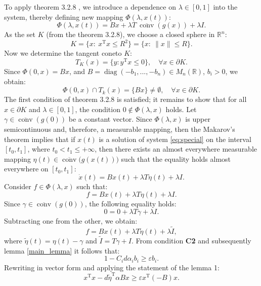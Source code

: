 \documentclass[journal]{IEEEtran}
\begin{document}
\begin{IEEEproof}
    To apply theorem 3.2.8 \cite[p. 90]{p3}, 
    we introduce a dependence on $\lambda \in [0,1]$ into the system, thereby defining new mapping $\varPhi(\lambda,x(t))$:
    \[\varPhi(\lambda,x(t)) = Bx + \lambda T~ \overline{\operatorname{conv}}(g(x))+\lambda I.\]
    As the set $K$ (from the theorem 3.2.8), we choose a closed sphere in $\mathbb{R}^n$:
    \[K = \{x:~x^\mathrm{T}x \leqslant R^2 \} = \{ x:~\|x\| \leqslant R\}.\]
Now we determine the tangent cone\footnotemark[2] to $K$:
\[T_K(x) = \{y : y^\mathrm{T}x \leqslant 0\}, \quad \forall x \in \partial K.\]
Since $\varPhi(0,x) = Bx$, and $B =\operatorname{diag}(-b_1,...,-b_n)\in M_n(\mathbb{R})$, $b_i>0$, we obtain:
\[\varPhi(0,x)\cap T_k(x) = \{Bx\} \ne \emptyset, \quad \forall x \in \partial K.\]
The first condition of theorem 3.2.8 is satisfied; it remains to show that for all $x \in \partial K$ and $\lambda \in [0,1]$, the condition $0 \notin \varPhi(\lambda,x)$ holds.
Let $\gamma \in \overline{\operatorname{conv}}(g(0))$ be a constant vector. Since $\varPhi(\lambda,x)$ is upper semicontinuous and, therefore, a measurable mapping, then the Makarov’s theorem \cite[p. 38, Th. 1.7]{Leonov} implies that if $x(t)$ is a solution of system \eqref{eq:special} on the interval $[t_0,t_1]$, where $t_0<t_1\leqslant+\infty$, then there exists an almost everywhere measurable mapping $\eta(t) \in \overline{\operatorname{conv}}\big(g(x(t))\big)$ such that the equality holds almost everywhere on $[t_0, t_1]$:
\[\dot x(t) = Bx(t) + \lambda T \eta(t) + \lambda I \tag{a.e.}.\]
Consider $f \in \varPhi(\lambda, x)$ such that:
\[f = Bx(t) + \lambda T \eta(t) + \lambda I .\]
Since $\gamma \in \overline{\operatorname{conv}}(g(0))$, the following equality holds:
\[0 =   0 + \lambda T \gamma + \lambda  I .\]
Subtracting one from the other, we obtain: 
\begin{equation}\label{2.3.4}
    f = Bx(t) + \lambda T \widetilde\eta(t) + \lambda \widetilde I,
\end{equation}
where $\widetilde\eta(t) = \eta(t) - \gamma$ and $\widetilde I = T \gamma + I$.
From condition \textbf{C2} and subsequently lemma \ref{main_lemma} it follows that:
    \[
    1 - C_i d  \alpha_i b_i \geqslant \varepsilon b_i. 
    \]
Rewriting in vector form and applying the statement of the lemma 1:
\begin{equation}\label{2.3.5}
x^\mathrm{T} x - d \widetilde{\eta}^{\mathrm{T}}  \alpha  Bx \geqslant \varepsilon x^\mathrm{T} (-B) x . 
\end{equation}


\end{IEEEproof}
\end{document}

